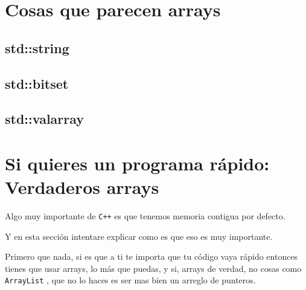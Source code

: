 \documentclass[12pt, fleqn]{report}                             %
\theoremstyle{break}                                            %
\newcommand{\textCode}[1]  { \texttt{#1} }                      %
\newcommand{\Cpp}{\ignorespaces\textCode{C++}}                  %
\begin{document}
        \clearpage
        \section{Cosas que parecen arrays} 
               
            \subsection{std::string}

            \subsection{std::bitset}

            \subsection{std::valarray}


        \clearpage
        \section{Si quieres un programa rápido: Verdaderos arrays} 

            Algo muy importante de \Cpp es que tenemos memoria contigua por defecto.

            Y en esta sección intentare explicar como es que eso es muy importante.

            Primero que nada, si es que a ti te importa que tu código vaya rápido entonces
            tienes que usar arrays, lo más que puedas, y si, arrays de verdad, no cosas
            como \textCode{ArrayList}, que no lo haces es ser mas bien un arreglo de punteros.
\end{document}

